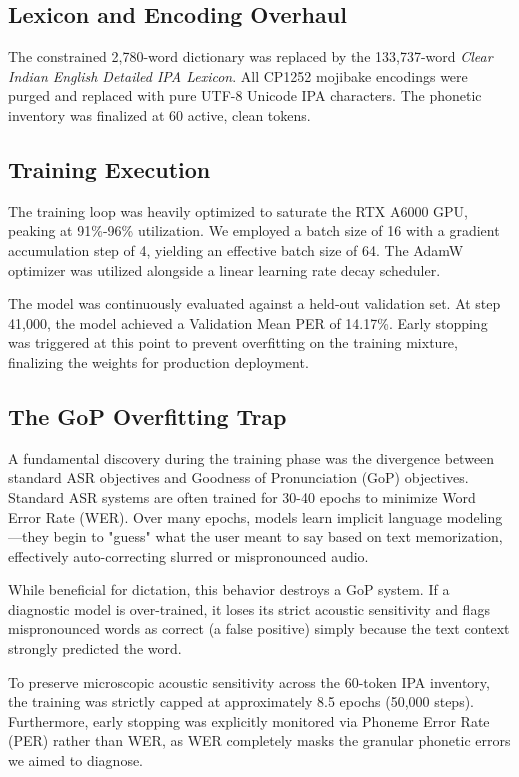 \subsection{Lexicon and Encoding Overhaul}
The constrained 2,780-word dictionary was replaced by the 133,737-word \textit{Clear Indian English Detailed IPA Lexicon}. All CP1252 mojibake encodings were purged and replaced with pure UTF-8 Unicode IPA characters. The phonetic inventory was finalized at 60 active, clean tokens.

\subsection{Training Execution}
The training loop was heavily optimized to saturate the RTX A6000 GPU, peaking at 91\%-96\% utilization. We employed a batch size of 16 with a gradient accumulation step of 4, yielding an effective batch size of 64. The AdamW optimizer was utilized alongside a linear learning rate decay scheduler. 

The model was continuously evaluated against a held-out validation set. At step 41,000, the model achieved a Validation Mean PER of 14.17\%. Early stopping was triggered at this point to prevent overfitting on the training mixture, finalizing the weights for production deployment.

\subsection{The GoP Overfitting Trap}
A fundamental discovery during the training phase was the divergence between standard ASR objectives and Goodness of Pronunciation (GoP) objectives. Standard ASR systems are often trained for 30-40 epochs to minimize Word Error Rate (WER). Over many epochs, models learn implicit language modeling—they begin to "guess" what the user meant to say based on text memorization, effectively auto-correcting slurred or mispronounced audio.

While beneficial for dictation, this behavior destroys a GoP system. If a diagnostic model is over-trained, it loses its strict acoustic sensitivity and flags mispronounced words as correct (a false positive) simply because the text context strongly predicted the word. 

To preserve microscopic acoustic sensitivity across the 60-token IPA inventory, the training was strictly capped at approximately 8.5 epochs (50,000 steps). Furthermore, early stopping was explicitly monitored via Phoneme Error Rate (PER) rather than WER, as WER completely masks the granular phonetic errors we aimed to diagnose.
